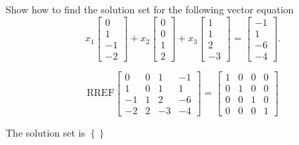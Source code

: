 
\begin{exerciseStatement}


Show how to find the solution set for the following vector equation \[ x_{1} \left[\begin{array}{c}
0 \\
1 \\
-1 \\
-2
\end{array}\right] + x_{2} \left[\begin{array}{c}
0 \\
0 \\
1 \\
2
\end{array}\right] + x_{3} \left[\begin{array}{c}
1 \\
1 \\
2 \\
-3
\end{array}\right] = \left[\begin{array}{c}
-1 \\
1 \\
-6 \\
-4
\end{array}\right] .\]


\end{exerciseStatement}
    
\begin{exerciseAnswer} 
\[\mathrm{RREF} \left[\begin{array}{ccc|c}
0 & 0 & 1 & -1 \\
1 & 0 & 1 & 1 \\
-1 & 1 & 2 & -6 \\
-2 & 2 & -3 & -4
\end{array}\right]  =  \left[\begin{array}{ccc|c}
1 & 0 & 0 & 0 \\
0 & 1 & 0 & 0 \\
0 & 0 & 1 & 0 \\
0 & 0 & 0 & 1
\end{array}\right] \]

The solution set is \( \left\{\right\} \)


\end{exerciseAnswer}
    
